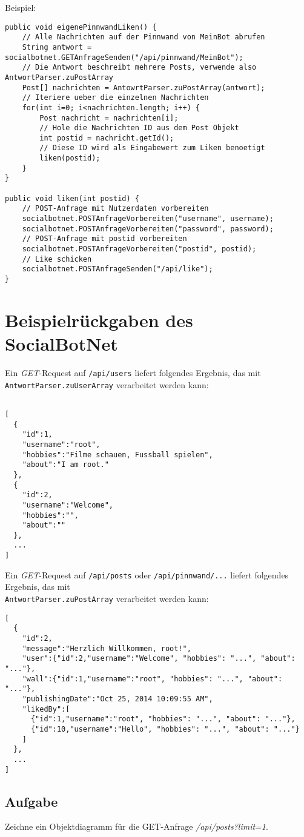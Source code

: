 \documentclass[parskip=half*]{scrartcl}
\begin{document}
Beispiel:
\begin{lstlisting}
public void eigenePinnwandLiken() {
    // Alle Nachrichten auf der Pinnwand von MeinBot abrufen
    String antwort = socialbotnet.GETAnfrageSenden("/api/pinnwand/MeinBot");
    // Die Antwort beschreibt mehrere Posts, verwende also AntwortParser.zuPostArray
    Post[] nachrichten = AntowrtParser.zuPostArray(antwort);
    // Iteriere ueber die einzelnen Nachrichten
    for(int i=0; i<nachrichten.length; i++) {
        Post nachricht = nachrichten[i];
        // Hole die Nachrichten ID aus dem Post Objekt
        int postid = nachricht.getId();
        // Diese ID wird als Eingabewert zum Liken benoetigt
        liken(postid);
    }
}

public void liken(int postid) {
    // POST-Anfrage mit Nutzerdaten vorbereiten
    socialbotnet.POSTAnfrageVorbereiten("username", username);
    socialbotnet.POSTAnfrageVorbereiten("password", password);
    // POST-Anfrage mit postid vorbereiten
    socialbotnet.POSTAnfrageVorbereiten("postid", postid);
    // Like schicken
    socialbotnet.POSTAnfrageSenden("/api/like");
}
\end{lstlisting}

\newpage
\section*{Beispielrückgaben des SocialBotNet}

Ein \emph{GET}-Request auf \lstinline{/api/users} liefert folgendes Ergebnis, das mit \lstinline{AntwortParser.zuUserArray} verarbeitet werden kann:
\begin{lstlisting}

[
  {
    "id":1,
    "username":"root",
    "hobbies":"Filme schauen, Fussball spielen",
    "about":"I am root."
  },
  {
    "id":2,
    "username":"Welcome",
    "hobbies":"",
    "about":""
  },
  ...
]
\end{lstlisting}


Ein \emph{GET}-Request auf \lstinline{/api/posts} oder \lstinline{/api/pinnwand/...} liefert folgendes Ergebnis, das mit \\\lstinline{AntwortParser.zuPostArray} verarbeitet werden kann:
\begin{lstlisting}
[
  {
    "id":2,
    "message":"Herzlich Willkommen, root!",
    "user":{"id":2,"username":"Welcome", "hobbies": "...", "about": "..."},
    "wall":{"id":1,"username":"root", "hobbies": "...", "about": "..."},
    "publishingDate":"Oct 25, 2014 10:09:55 AM",
    "likedBy":[
      {"id":1,"username":"root", "hobbies": "...", "about": "..."},
      {"id":10,"username":"Hello", "hobbies": "...", "about": "..."}
    ]
  },
  ...
]
\end{lstlisting}

\subsection*{Aufgabe} Zeichne ein Objektdiagramm für die GET-Anfrage \emph{/api/posts?limit=1}.
\end{document}
